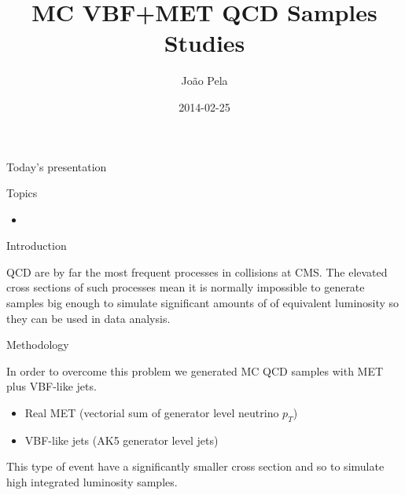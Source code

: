 \documentclass[8pt]{beamer}
\author[J. Pela]{João Pela}
\title[MC VBF QCD]{MC VBF+MET QCD Samples Studies}
\institute[ICL]{Imperial College London}
\date{2014-02-25}
\begin{document}
\setlength{\unitlength}{1mm}

\begin{frame}
  \titlepage
\end{frame}

\begin{frame}{Today's presentation}
 
\begin{block}{Topics}
 
\begin{itemize}
  \item 
\end{itemize}
 
\end{block}

\end{frame}

\begin{frame}{Introduction}


QCD are by far the most frequent processes in collisions at CMS. The elevated cross sections of such processes mean it is normally impossible to generate samples big enough to simulate 
significant amounts of of equivalent luminosity so they can be used in data analysis.

\begin{block}{Methodology}

In order to overcome this problem we generated MC QCD samples with MET plus VBF-like jets.
\begin{itemize}
  \item Real MET (vectorial sum of generator level neutrino $p_T$)
  \item VBF-like jets (AK5 generator level jets)
\end{itemize}

\end{block}

This type of event have a significantly smaller cross section and so to simulate high integrated luminosity samples. 
 
\end{frame}
\end{document}
